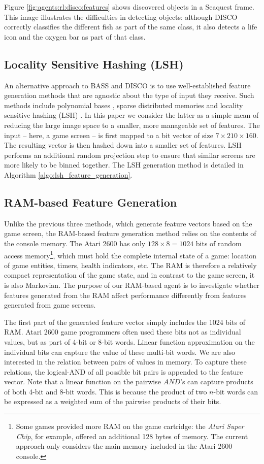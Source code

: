 \documentclass[twoside,11pt]{article}
\begin{document}
Figure \ref{fig:agents:rl:disco:features} shows discovered objects in a Seaquest frame. This image illustrates the difficulties in detecting objects: although DISCO correctly classifies the different fish as part of the same class, it also detects a life icon and the oxygen bar as part of that class. 

\subsection{Locality Sensitive Hashing (LSH)}

An alternative approach to BASS and DISCO is to use well-established feature generation methods that are agnostic about the type of input they receive. Such methods include polynomial bases \cite{schweitzer_85}, sparse distributed memories \cite{kanerva_88} and locality sensitive hashing (LSH) \cite{gionis_99}. In this paper we consider the latter as a simple mean of reducing the large image space to a smaller, more manageable set of features. The input -- here, a game screen -- is first mapped to a bit vector of size $7 \times 210 \times 160$. The resulting vector is then hashed down into a smaller set of features. LSH performs an additional random projection step to ensure that similar screens are more likely to be binned together. The LSH generation method is detailed in Algorithm \ref{algo:lsh_feature_generation}. 
\subsection{RAM-based Feature Generation}
\label{sec:agents:rl:ram}
Unlike the previous three methods, which generate feature vectors based on the game screen, the RAM-based feature generation method relies on the contents of the console memory. The Atari 2600 has only $128 \times 8 = 1024$ bits of random access memory\footnote{Some games provided more RAM on the game cartridge: the \emph{Atari Super Chip}, for example, offered an additional 128 bytes of memory. The current approach only considers the main memory included in the Atari 2600 console.}, which must hold the complete internal state of a game: location of game entities, timers, health indicators, etc. The RAM is therefore a relatively compact representation of the game state, and in contrast to the game screen, it is also Markovian. The purpose of our RAM-based agent is to investigate whether features generated from the RAM affect performance differently from features generated from game screens. 

The first part of the generated feature vector simply includes the 1024 bits of RAM. Atari 2600 game programmers often used these bits not as individual values, but as part of 4-bit or 8-bit words. Linear function approximation on the individual bits can capture the value of these multi-bit words. We are also interested in the relation between pairs of values in memory. To capture these relations, the logical-AND of all possible bit pairs is appended to the feature vector. Note that a linear function on the pairwise $AND$'s can capture products of both 4-bit and 8-bit words. This is because the product of two $n$-bit words can be expressed as a weighted sum of the pairwise products of their bits.
\end{document}

